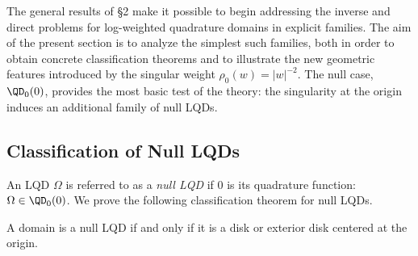 \documentclass{article}
\numberwithin{equation}{section}
\begin{document}
The general results of §2 make it possible to begin addressing the inverse and direct problems for log-weighted quadrature domains in explicit families. The aim of the present section is to analyze the simplest such families, both in order to obtain concrete classification theorems and to illustrate the new geometric features introduced by the singular weight $\rho_0(w)=|w|^{-2}$. The null case, $\QD_0(0)$, provides the most basic test of the theory: the singularity at the origin induces an additional family of null LQDs.




\subsection{Classification of Null LQDs}\label{subsec:NullLQDs}
An LQD $\Omega$ is referred to as a \emph{null LQD} if $0$ is its quadrature function: $\Omega\in\QD_0(0)$. We prove the following classification theorem for null LQDs.
\begin{theorem}\label{thm:NullLQDClass}
A domain is a null LQD if and only if it is a disk or exterior disk centered at the origin.
\end{theorem}
\end{document}
